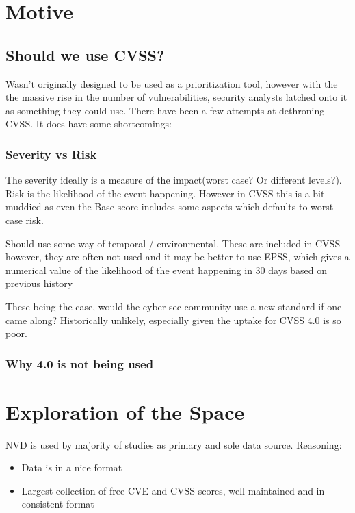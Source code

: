 \documentclass[11pt]{article}
\begin{document}
\section{Motive}
\subsection{Should we use CVSS?}

Wasn't originally designed to be used as a prioritization tool, however with the the massive rise in
the number of vulnerabilities, security analysts latched onto it as something they could use.
There have been a few attempts at dethroning CVSS. It does have some shortcomings:

\subsubsection*{Severity vs Risk}

The severity ideally is a measure of the impact(worst case? Or different levels?). Risk is the
likelihood of the event happening. However in CVSS this is a bit muddied as even the Base score
includes some aspects which defaults to worst case risk.

Should use some way of temporal / environmental. These are included in CVSS however, they are often
not used and it may be better to use EPSS, which gives a numerical value of the likelihood of the
event happening in 30 days based on previous history

These being the case, would the cyber sec community use a new standard if one came along?
Historically unlikely, especially given the uptake for CVSS 4.0 is so poor.

\subsubsection{Why 4.0 is not being used}
\section{Exploration of the Space}

NVD is used by majority of studies as primary and sole data source.
Reasoning:
\begin{itemize}
	\item Data is in a nice format
	\item Largest collection of free CVE and CVSS scores, well maintained and in consistent format
\end{itemize}
\end{document}
